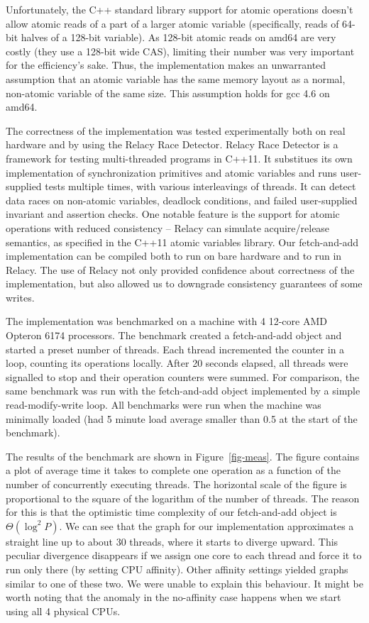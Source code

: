 \documentclass{thesis}
\begin{document}
Unfortunately, the C++ standard library support for atomic operations doesn't allow atomic reads of a part of a larger atomic variable (specifically, reads of 64-bit halves of a 128-bit variable).
As 128-bit atomic reads on amd64 are very costly
(they use a 128-bit wide CAS), limiting their number was very important for the efficiency's sake. Thus, the implementation makes an unwarranted assumption that an atomic variable
has the same memory layout as a normal, non-atomic variable of the same size. This assumption holds for gcc 4.6 on amd64.

The correctness of the implementation was tested experimentally both on real hardware and by using the Relacy Race Detector\cite{rrd}. Relacy Race Detector is a framework for testing multi-threaded programs in C++11.
It substitues its own
implementation of synchronization primitives and atomic variables and runs user-supplied tests multiple times, with various interleavings of threads.
It can detect data races on non-atomic variables, deadlock conditions, and failed user-supplied invariant and assertion
checks. One notable feature is the support for atomic operations with reduced consistency -- Relacy can simulate acquire/release semantics, as specified in the C++11 atomic variables library.
Our fetch-and-add implementation can be compiled both to run on bare hardware and to run in Relacy. The use of Relacy not only provided confidence about correctness of the implementation, but also allowed us to downgrade
consistency guarantees of some writes.


The implementation was benchmarked on a machine with 4 12-core AMD Opteron 6174 processors.
The benchmark created a fetch-and-add object and started a preset number of threads. Each thread incremented the counter in a loop, counting its operations locally. After 20 seconds elapsed, all threads were signalled
to stop and their operation counters were summed. For comparison, the same benchmark was run with the fetch-and-add object implemented by a simple read-modify-write loop. All benchmarks were run when the machine was
minimally loaded (had 5 minute load average smaller than 0.5 at the start of the benchmark).

The results of the benchmark are shown in Figure~\ref{fig-meas}. The figure contains a plot of average time it takes to complete one operation as a function of the number of concurrently executing threads. 
The horizontal scale of the figure is proportional to the square of the logarithm of the number of threads. The reason for this is that the optimistic time complexity
of our fetch-and-add object is $\Theta(\log^2 P)$. We can see that the graph for our implementation approximates a straight line up to about 30 threads, where it starts to diverge upward. This peculiar divergence disappears
if we assign one core to each thread and force it to run only there (by setting CPU affinity). Other affinity settings yielded graphs similar to one of these two. We were unable to explain this behaviour. It might
be worth noting that the anomaly in the no-affinity case happens when we start using all 4 physical CPUs.
\end{document}

